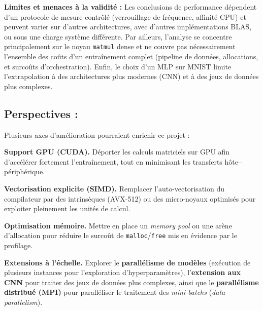 \documentclass[a4paper,11pt]{article}
\begin{document}
\textbf{Limites et menaces à la validité :}
Les conclusions de performance dépendent d'un protocole de mesure contrôlé (verrouillage de fréquence, affinité CPU) et peuvent varier sur d'autres architectures, avec d'autres implémentations BLAS, ou sous une charge système différente. Par ailleurs, l'analyse se concentre principalement sur le noyau \texttt{matmul} dense et ne couvre pas nécessairement l'ensemble des coûts d'un entraînement complet (pipeline de données, allocations, et surcoûts d'orchestration). Enfin, le choix d'un MLP sur MNIST limite l'extrapolation à des architectures plus modernes (CNN) et à des jeux de données plus complexes.


\subsection{Perspectives :}

Plusieurs axes d'amélioration pourraient enrichir ce projet :

\textbf{Support GPU (CUDA).} Déporter les calculs matriciels sur GPU afin d'accélérer fortement l'entraînement, tout en minimisant les transferts hôte–périphérique.

\textbf{Vectorisation explicite (SIMD).} Remplacer l'auto-vectorisation du compilateur par des intrinsèques (AVX-512) ou des micro-noyaux optimisés pour exploiter pleinement les unités de calcul.

\textbf{Optimisation mémoire.} Mettre en place un \textit{memory pool} ou une arène d'allocation pour réduire le surcoût de \texttt{malloc}/\texttt{free} mis en évidence par le profilage.

\textbf{Extensions à l'échelle.} Explorer le \textbf{parallélisme de modèles} (exécution de plusieurs instances pour l'exploration d'hyperparamètres), l'\textbf{extension aux CNN} pour traiter des jeux de données plus complexes, ainsi que le \textbf{parallélisme distribué (MPI)} pour paralléliser le traitement des \textit{mini-batchs} (\textit{data parallelism}).

\clearpage
\end{document}
